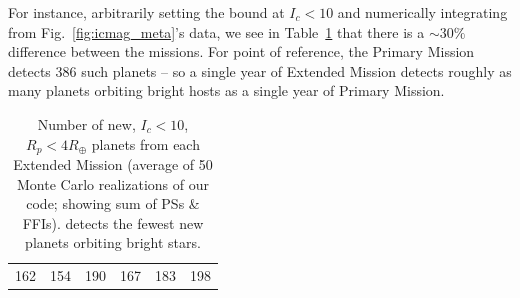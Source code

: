 For instance, arbitrarily setting the bound at $I_c<10$ and numerically 
integrating from Fig.~\ref{fig:icmag_meta}'s data, we see in 
Table~\ref{tab:icmag_meta} that there is a $\sim30\%$ difference between the 
missions.
For point of reference, the Primary Mission detects 386 such planets -- so a single year of Extended Mission detects roughly as many planets orbiting bright hosts as a single year of Primary Mission.
\begin{table}[!t]
	\centering
	\caption{Number of new, $I_c<10$, $R_p<4R_\oplus$ planets from each Extended Mission (average of 50 Monte Carlo realizations of our code; showing sum of PSs \& FFIs). \npole\:detects the fewest new planets orbiting bright stars.}
	\label{tab:icmag_meta}
	\begin{tabular}{|c|c|c|c|c|c|}
		\hline
		\nhemi & \npole & \shemiAvoid & \elong & \eshort & \hemis \\ \hline
		162    & 154    & 190         & 167    & 183     & 198    \\ \hline
	\end{tabular}
\end{table}

